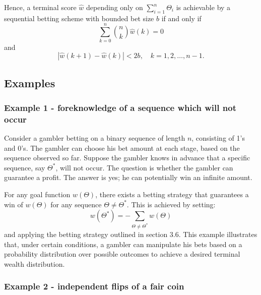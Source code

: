\documentclass[11pt]{article}
\numberwithin{equation}{section}
\theoremstyle{boldStyle}
\begin{document}
Hence, a terminal score \(\hat{w}\) depending only on \(\sum_{i=1}^n \Theta_i\) is achievable by a sequential betting scheme with bounded bet size \(b\) if and only if
\begin{equation} \label{eq:3.14}
    \sum_{k=0}^n \binom{n}{k} \hat{w}(k) = 0
\end{equation}
and
\begin{equation} \label{eq:3.15}
    \left| \hat{w}(k + 1) - \hat{w}(k)\right| < 2b, \quad k = 1, 2, \ldots, n - 1.
\end{equation}

\subsection{Examples}

\subsubsection{Example 1 - foreknowledge of a sequence which will not occur}

Consider a gambler betting on a binary sequence of length \(n\), consisting of 1's and 0's. 
The gambler can choose his bet amount at each stage, based on the sequence observed so far. 
Suppose the gambler knows in advance that a specific sequence, say \(\Theta^*\), will not occur. 
The question is whether the gambler can guarantee a profit. The answer is yes; he can potentially win an infinite amount. 

For any goal function \(w(\Theta)\), there exists a betting strategy that guarantees a win of \(w(\Theta)\) 
for any sequence \(\Theta \neq \Theta^*\). This is achieved by setting:
\[
w(\Theta^*) = -\sum_{\Theta \neq \Theta^*} w(\Theta)
\]
and applying the betting strategy outlined in section \(3.6\).
This example illustrates that, under certain conditions, a gambler can manipulate his bets based on a probability distribution over possible outcomes 
to achieve a desired terminal wealth distribution. 

\subsubsection{Example 2 - independent flips of a fair coin}
\end{document}

